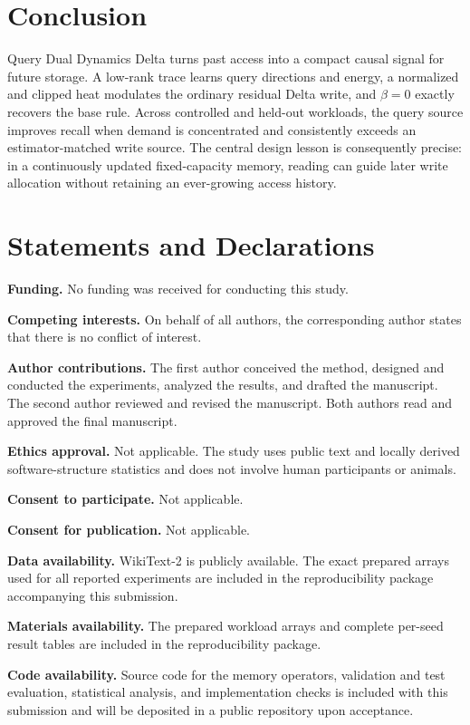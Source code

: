 \documentclass[pdflatex,sn-mathphys-num]{sn-jnl}
\theoremstyle{thmstyleone}
\begin{document}
\section{Conclusion}\label{sec:conclusion}

Query Dual Dynamics Delta turns past access into a compact causal signal for future storage. A low-rank trace learns query directions and energy, a normalized and clipped heat modulates the ordinary residual Delta write, and $\beta=0$ exactly recovers the base rule. Across controlled and held-out workloads, the query source improves recall when demand is concentrated and consistently exceeds an estimator-matched write source. The central design lesson is consequently precise: in a continuously updated fixed-capacity memory, reading can guide later write allocation without retaining an ever-growing access history.

\section*{Statements and Declarations}

\noindent\textbf{Funding.} No funding was received for conducting this study.

\noindent\textbf{Competing interests.} On behalf of all authors, the corresponding author states that there is no conflict of interest.

\noindent\textbf{Author contributions.} The first author conceived the method, designed and conducted the experiments, analyzed the results, and drafted the manuscript. The second author reviewed and revised the manuscript. Both authors read and approved the final manuscript.

\noindent\textbf{Ethics approval.} Not applicable. The study uses public text and locally derived software-structure statistics and does not involve human participants or animals.

\noindent\textbf{Consent to participate.} Not applicable.

\noindent\textbf{Consent for publication.} Not applicable.

\noindent\textbf{Data availability.} WikiText-2 is publicly available. The exact prepared arrays used for all reported experiments are included in the reproducibility package accompanying this submission.

\noindent\textbf{Materials availability.} The prepared workload arrays and complete per-seed result tables are included in the reproducibility package.

\noindent\textbf{Code availability.} Source code for the memory operators, validation and test evaluation, statistical analysis, and implementation checks is included with this submission and will be deposited in a public repository upon acceptance.

\nocite{*}

\end{document}
